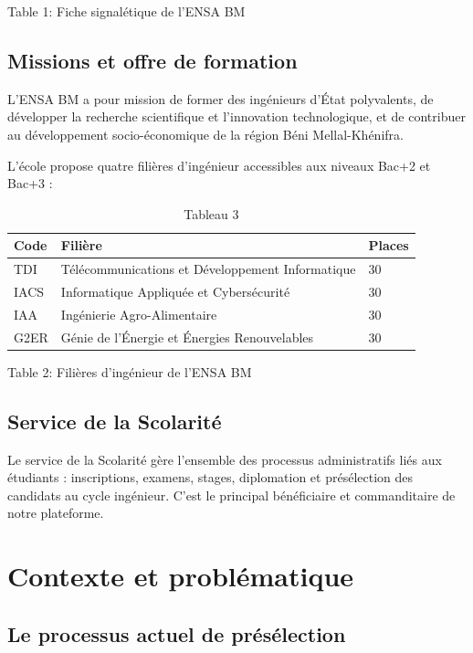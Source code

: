 Table 1:  Fiche signalétique de l'ENSA BM

\subsection{Missions et offre de formation}

L'ENSA BM a pour mission de former des ingénieurs d'État polyvalents, de développer la recherche scientifique et l'innovation technologique, et de contribuer au développement socio-économique de la région Béni Mellal-Khénifra.

L'école propose quatre filières d'ingénieur accessibles aux niveaux Bac+2 et Bac+3 :

\begin{table}[htbp]
\centering
\begin{tabular}{|l|l|l|}
\hline
Code & Filière & Places \\
\hline
TDI & Télécommunications et Développement Informatique & 30 \\
\hline
IACS & Informatique Appliquée et Cybersécurité & 30 \\
\hline
IAA & Ingénierie Agro-Alimentaire & 30 \\
\hline
G2ER & Génie de l'Énergie et Énergies Renouvelables & 30 \\
\hline
\end{tabular}
\caption{Tableau 3}
\label{tab:table_3}
\end{table}

Table 2: Filières d'ingénieur de l'ENSA BM

\subsection{Service de la Scolarité}

Le service de la Scolarité gère l'ensemble des processus administratifs liés aux étudiants : inscriptions, examens, stages, diplomation et présélection des candidats au cycle ingénieur. C'est le principal bénéficiaire et commanditaire de notre plateforme.

\section{Contexte et problématique}

\subsection{Le processus actuel de présélection}

